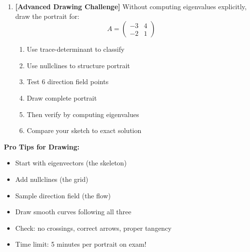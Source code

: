 \documentclass[12pt]{article}
\begin{document}
\begin{enumerate}[resume]
\item \textbf{[Advanced Drawing Challenge]}
Without computing eigenvalues explicitly, draw the portrait for:
$$A = \begin{pmatrix} -3 & 4 \\ -2 & 1 \end{pmatrix}$$
\begin{enumerate}[label=(\alph*)]
    \item Use trace-determinant to classify
    \item Use nullclines to structure portrait
    \item Test 6 direction field points
    \item Draw complete portrait
    \item Then verify by computing eigenvalues
    \item Compare your sketch to exact solution
\end{enumerate}
\end{enumerate}

\begin{technique}
\textbf{Pro Tips for Drawing:}
\begin{itemize}
    \item Start with eigenvectors (the skeleton)
    \item Add nullclines (the grid)
    \item Sample direction field (the flow)
    \item Draw smooth curves following all three
    \item Check: no crossings, correct arrows, proper tangency
    \item Time limit: 5 minutes per portrait on exam!
\end{itemize}
\end{technique}
\end{document}
